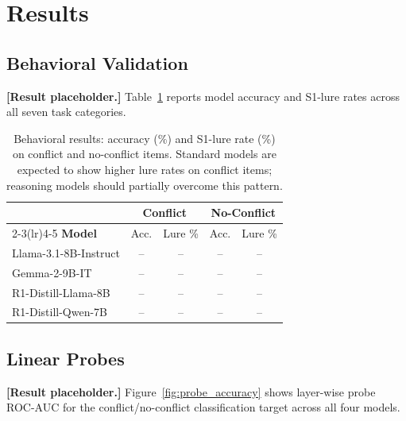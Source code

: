 
\section{Results}
\label{sec:results}

\subsection{Behavioral Validation}
\label{sec:results_behavioral}

\textbf{[Result placeholder.]}  Table~\ref{tab:behavioral} reports model
accuracy and S1-lure rates across all seven task categories.

\begin{table}[t]
\centering
\caption{Behavioral results: accuracy (\%) and S1-lure rate (\%) on conflict
  and no-conflict items.  Standard models are expected to show higher lure
  rates on conflict items; reasoning models should partially overcome this
  pattern.}
\label{tab:behavioral}
\vspace{4pt}
\small
\begin{tabular}{lcccc}
\toprule
& \multicolumn{2}{c}{\textbf{Conflict}} & \multicolumn{2}{c}{\textbf{No-Conflict}} \\
\cmidrule(lr){2-3}\cmidrule(lr){4-5}
\textbf{Model} & Acc. & Lure \% & Acc. & Lure \% \\
\midrule
Llama-3.1-8B-Instruct   & -- & -- & -- & -- \\
Gemma-2-9B-IT            & -- & -- & -- & -- \\
R1-Distill-Llama-8B     & -- & -- & -- & -- \\
R1-Distill-Qwen-7B      & -- & -- & -- & -- \\
\bottomrule
\end{tabular}
\end{table}

\subsection{Linear Probes}
\label{sec:results_probes}

\textbf{[Result placeholder.]}  Figure~\ref{fig:probe_accuracy} shows
layer-wise probe ROC-AUC for the conflict/no-conflict classification target
across all four models.

